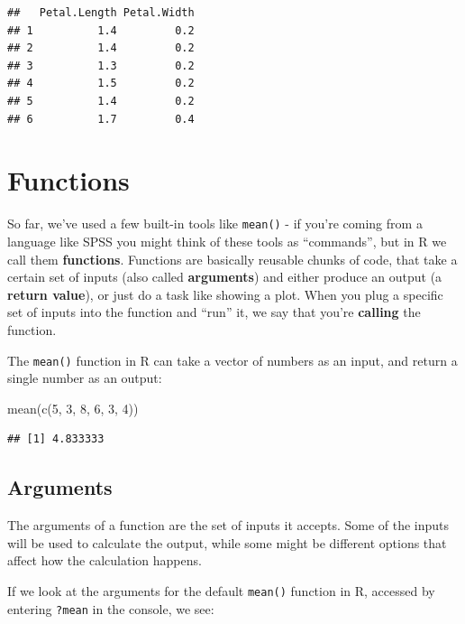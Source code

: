\documentclass[
]{book}
\newenvironment{Shaded}{\begin{snugshade}}{\end{snugshade}}
\newcommand{\DecValTok}[1]{\textcolor[rgb]{0.00,0.00,0.81}{#1}}
\newcommand{\FunctionTok}[1]{\textcolor[rgb]{0.00,0.00,0.00}{#1}}
\newcommand{\NormalTok}[1]{#1}
\begin{document}
\begin{verbatim}
##   Petal.Length Petal.Width
## 1          1.4         0.2
## 2          1.4         0.2
## 3          1.3         0.2
## 4          1.5         0.2
## 5          1.4         0.2
## 6          1.7         0.4
\end{verbatim}

\hypertarget{functions}{%
\chapter{Functions}\label{functions}}

So far, we've used a few built-in tools like \texttt{mean()} - if you're
coming from a language like SPSS you might think of these tools as ``commands'',
but in R we call them \textbf{functions}. Functions are basically reusable chunks of
code, that take a certain set of inputs (also called \textbf{arguments}) and either
produce an output (a \textbf{return value}), or just do a task like showing a plot.
When you plug a specific set of inputs into the function and ``run'' it, we say
that you're \textbf{calling} the function.

The \texttt{mean()} function in R can take a vector of numbers as an input,
and return a single number as an output:

\begin{Shaded}
\begin{Highlighting}[]
\FunctionTok{mean}\NormalTok{(}\FunctionTok{c}\NormalTok{(}\DecValTok{5}\NormalTok{, }\DecValTok{3}\NormalTok{, }\DecValTok{8}\NormalTok{, }\DecValTok{6}\NormalTok{, }\DecValTok{3}\NormalTok{, }\DecValTok{4}\NormalTok{))}
\end{Highlighting}
\end{Shaded}

\begin{verbatim}
## [1] 4.833333
\end{verbatim}

\hypertarget{arguments}{%
\section{Arguments}\label{arguments}}

The arguments of a function are the set of inputs it accepts. Some
of the inputs will be used to calculate the output, while some
might be different options that affect how the calculation happens.

If we look at the arguments for the default \texttt{mean()} function in R,
accessed by entering \texttt{?mean} in the console, we see:
\end{document}
